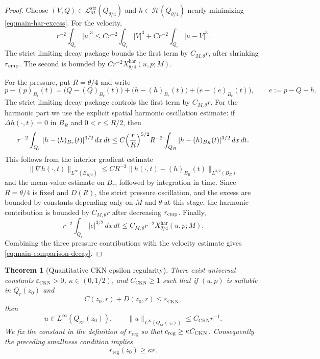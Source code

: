 \documentclass[11pt]{article}
\numberwithin{equation}{section}
\theoremstyle{plain}
\newtheorem{theorem}{Theorem}[section]
\theoremstyle{definition}
\theoremstyle{remark}
\newcommand{\eps}{\varepsilon}
\newcommand{\reg}{\mathrm{reg}}
\newcommand{\har}{\mathrm{har}}
\newcommand{\str}{\mathrm{str}}
\newcommand{\CKN}{\mathrm{CKN}}
\newcommand{\calH}{\mathcal H}
\newcommand{\calL}{\mathcal L}
\begin{document}
\begin{proof}
Choose \((V,Q)\in\calL_M^{\str}(Q_{\theta/4})\) and \(h\in\calH(Q_{\theta/4})\) nearly minimizing \eqref{eq:main-har-excess}.  For the velocity,
\[
        r^{-2}\int_{Q_r}|u|^3
        \le C r^{-2}\int_{Q_r}|V|^3
        +C r^{-2}\int_{Q_r}|u-V|^3.
\]
The strict limiting decay package bounds the first term by \(C_{M,\theta}r\), after shrinking \(r_{\rm cmp}\).  The second is bounded by \(C r^{-2}X^{\har}_{\theta/4}(u,p;M)\).

For the pressure, put \(R=\theta/4\) and write
\[
        p-(p)_{B_r}(t)
        =\bigl(Q-(Q)_{B_r}(t)\bigr)
        +\bigl(h-(h)_{B_r}(t)\bigr)
        +\bigl(e-(e)_{B_r}(t)\bigr),
        \qquad e:=p-Q-h .
\]
The strict limiting decay package controls the first term by \(C_{M,\theta}r\).  For the harmonic part we use the explicit spatial harmonic oscillation estimate: if \(\Delta h(\cdot,t)=0\) in \(B_R\) and \(0<r\le R/2\), then
\[
        r^{-2}\int_{Q_r}|h-(h)_{B_r}(t)|^{3/2}\,dx\,dt
        \le C\Bigl(\frac rR\Bigr)^{5/2}
        R^{-2}\int_{Q_R}|h-(h)_{B_R}(t)|^{3/2}\,dx\,dt .
\]
This follows from the interior gradient estimate
\[
        \|\nabla h(\cdot,t)\|_{L^\infty(B_{R/2})}
        \le C R^{-3}\|h(\cdot,t)-(h)_{B_R}(t)\|_{L^{3/2}(B_R)}
\]
and the mean-value estimate on \(B_r\), followed by integration in time.  Since \(R=\theta/4\) is fixed and \(D(R)\), the strict pressure oscillation, and the excess are bounded by constants depending only on \(M\) and \(\theta\) at this stage, the harmonic contribution is bounded by \(C_{M,\theta}r\) after decreasing \(r_{\rm cmp}\).  Finally,
\[
        r^{-2}\int_{Q_r}|e|^{3/2}\,dx\,dt
        \le C_{M,\theta}r^{-2}X^{\har}_{\theta/4}(u,p;M).
\]
Combining the three pressure contributions with the velocity estimate gives \eqref{eq:main-comparison-decay}.
\end{proof}

\begin{theorem}[Quantitative CKN epsilon regularity]\label{thm:main-CKN}
There exist universal constants \(\eps_{\CKN}>0\), \(\kappa\in(0,1/2)\), and \(C_{\CKN}\ge1\) such that if \((u,p)\) is suitable in \(Q_r(z_0)\) and
\[
        C(z_0,r)+D(z_0,r)\le\eps_{\CKN},
\]
then
\[
        u\in L^\infty(Q_{\kappa r}(z_0)),
        \qquad
        \|u\|_{L^\infty(Q_{\kappa r}(z_0))}\le C_{\CKN}r^{-1}.
\]
We fix the constant in the definition of \(r_{\reg}\) so that \(c_{\rm reg}\ge \kappa C_{\CKN}\).  Consequently the preceding smallness condition implies
\[
        r_{\reg}(z_0)\ge \kappa r .
\]
\end{theorem}
\end{document}
